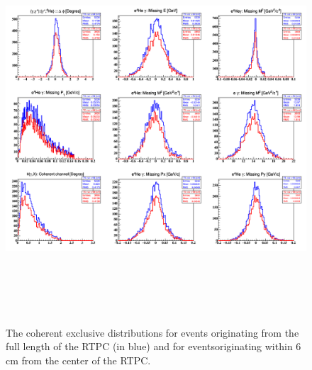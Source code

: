 \begin{figure}[tbp]
\centering
\includegraphics[height=14.5cm]{fig/coh_exc_cuts_z.png}
\caption{The coherent exclusive distributions for events 
originating from the full length of the RTPC (in blue) and for 
eventsoriginating within 6 cm from the center 
of the RTPC.}
\label{fig:coh_exc_cuts_z}
 \end{figure}

